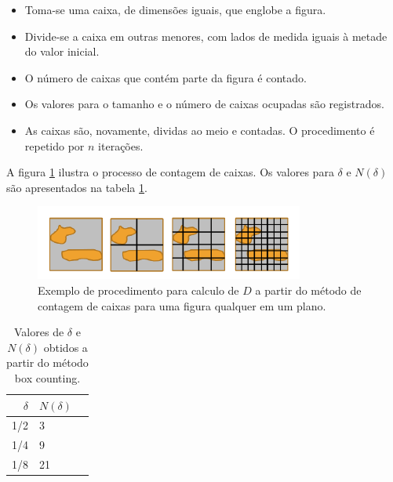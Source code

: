 \documentclass{ufscThesis}
\begin{document}
\begin{itemize}
\item Toma-se uma caixa, de dimensões iguais, que englobe a figura.
\item Divide-se a caixa em outras menores, com lados de medida iguais à metade do valor inicial.
\item O número de caixas que contém parte da figura é contado.
\item Os valores para o tamanho e o número de caixas ocupadas são registrados.
\item As caixas são, novamente, dividas ao meio e contadas. O procedimento é repetido por $n$ iterações.
\end{itemize}

A figura \ref{figurabox} ilustra o processo de contagem de caixas. Os valores para $\delta$ e $N(\delta)$ são apresentados na tabela \ref{tabbox}.

\begin{figure}[!h]
\centering
\includegraphics[scale=0.75]{boxcount.png}
\caption{Exemplo de procedimento para calculo de $D$ a partir do método de contagem de caixas para uma figura qualquer em um plano.}
\label{figurabox}
\end{figure}

\begin{table}[h]
\centering
\begin{tabular}{r|lr}
 
$\delta$ & $N(\delta)$\\
\hline                               %
1/2 & 3\\
1/4 & 9\\
1/8 & 21
 
\end{tabular}
\caption{Valores de $\delta$ e $N(\delta)$ obtidos a partir do método box counting.}
\label{tabbox}
\end{table}
\end{document}
